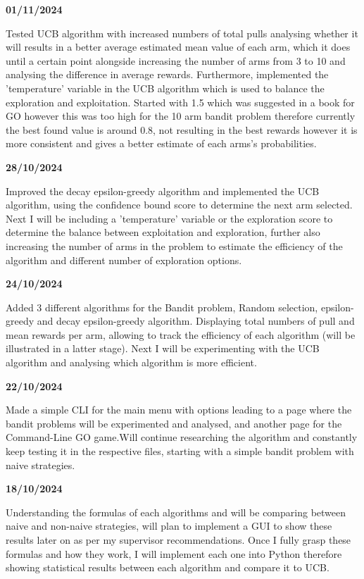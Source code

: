 \documentclass[]{final_report}
\begin{document}
\textbf{01/11/2024}

Tested UCB algorithm with increased numbers of total pulls analysing whether it will results in a better average estimated mean value of each arm, which it does until a certain point alongside increasing the number of arms from 3 to 10 and analysing the difference in average rewards. Furthermore, implemented the 'temperature' variable in the UCB algorithm which is used to balance the exploration and exploitation. Started with 1.5 which was suggested in a book for GO however this was too high for the 10 arm bandit problem therefore currently the best found value is around 0.8, not resulting in the best rewards however it is more consistent and gives a better estimate of each arms's probabilities.  

\textbf{28/10/2024}

Improved the decay epsilon-greedy algorithm and implemented the UCB algorithm, using the confidence bound score to determine the next arm selected. Next I will be including a 
'temperature' variable or the exploration score to determine the balance between exploitation and exploration, further also increasing the number of arms in the problem to 
estimate the efficiency of the algorithm and different number of exploration options.  

\textbf{24/10/2024}

Added 3 different algorithms for the Bandit problem, Random selection, epsilon-greedy and decay epsilon-greedy algorithm. Displaying total numbers of pull and mean rewards per arm,
allowing to track the efficiency of each algorithm (will be illustrated in a latter stage). Next I will be experimenting with the UCB algorithm and analysing which algorithm is more
efficient.  

\textbf{22/10/2024}

Made a simple CLI for the main menu with options leading to a page where the bandit problems will be experimented and analysed, and another page for the Command-Line GO game.Will continue researching the algorithm and constantly keep testing it in the respective files, starting with a simple bandit problem with naive strategies.  
  
\textbf{18/10/2024}

Understanding the formulas of each algorithms and will be comparing between naive and non-naive strategies, will plan to implement a GUI to show these results later on as per my supervisor recommendations.
Once I fully grasp these formulas and how they work, I will implement each one into Python therefore showing statistical results between each algorithm and compare it to UCB.   
  
\end{document}
